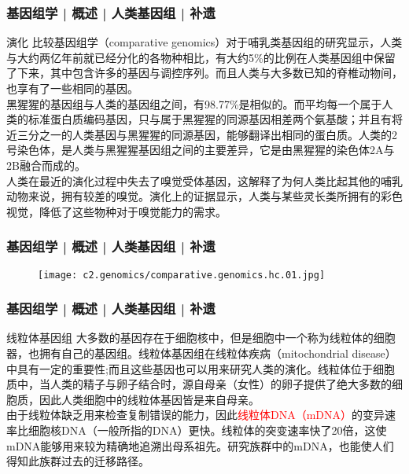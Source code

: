 \begin{frame}
  \frametitle{基因组学 | 概述 | 人类基因组 | 补遗}
  \begin{block}{演化}
比较基因组学（comparative genomics）对于哺乳类基因组的研究显示，人类与大约两亿年前就已经分化的各物种相比，有大约5\%的比例在人类基因组中保留了下来，其中包含许多的基因与调控序列。而且人类与大多数已知的脊椎动物间，也享有了一些相同的基因。\\
 \vspace{1em}
黑猩猩的基因组与人类的基因组之间，有98.77\%是相似的。而平均每一个属于人类的标准蛋白质编码基因，只与属于黑猩猩的同源基因相差两个氨基酸；并且有将近三分之一的人类基因与黑猩猩的同源基因，能够翻译出相同的蛋白质。人类的2号染色体，是人类与黑猩猩基因组之间的主要差异，它是由黑猩猩的染色体2A与2B融合而成的。\\
 \vspace{1em}
人类在最近的演化过程中失去了嗅觉受体基因，这解释了为何人类比起其他的哺乳动物来说，拥有较差的嗅觉。演化上的证据显示，人类与某些灵长类所拥有的彩色视觉，降低了这些物种对于嗅觉能力的需求。
  \end{block}
\end{frame}

\begin{frame}
  \frametitle{基因组学 | 概述 | 人类基因组 | 补遗}
  \begin{figure}
    \centering
    \texttt{[image: c2.genomics/comparative.genomics.hc.01.jpg]}
  \end{figure}
\end{frame}

\begin{frame}
  \frametitle{基因组学 | 概述 | 人类基因组 | 补遗}
  \begin{block}{线粒体基因组}
大多数的基因存在于细胞核中，但是细胞中一个称为线粒体的细胞器，也拥有自己的基因组。线粒体基因组在线粒体疾病（mitochondrial disease）中具有一定的重要性;而且这些基因也可以用来研究人类的演化。线粒体位于细胞质中，当人类的精子与卵子结合时，源自母亲（女性）的卵子提供了绝大多数的细胞质，因此人类细胞中的线粒体基因皆是来自母亲。\\
\vspace{1em}
由于线粒体缺乏用来检查复制错误的能力，因此\textcolor{red}{线粒体DNA（mDNA）}的变异速率比细胞核DNA（一般所指的DNA）更快。线粒体的突变速率快了20倍，这使mDNA能够用来较为精确地追溯出母系祖先。研究族群中的mDNA，也能使人们得知此族群过去的迁移路径。
  \end{block}
\end{frame}

